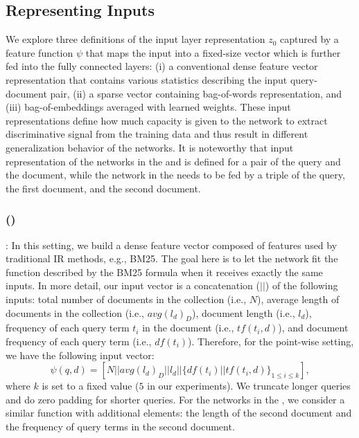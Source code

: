 \subsection{Representing Inputs}
\label{sec:feedings}
We explore three definitions of the input layer representation $z_0$ captured by a feature function $\psi$ that maps the input into a fixed-size vector which is further fed into the fully connected layers: 
(i) a conventional dense feature vector representation that contains various statistics describing the input query-document pair, 
(ii) a sparse vector containing bag-of-words representation, and 
(iii) bag-of-embeddings averaged with learned weights. 
These input representations define how much capacity is given to the network to extract discriminative signal from the training data and thus result in different generalization behavior of the networks. 
It is noteworthy that input representation of the networks in the \modelone and \modeltwo is defined for a pair of the query and the document, while the network in the \modelthree needs to be fed by a triple of the query, the first document, and the second document.

\subsubsection{\Feedone (\fone)}: 
In this setting, we build a dense feature vector composed of features used by traditional IR methods, e.g., BM25. The goal here is to let the network fit the function described by the BM25 formula when it receives exactly the same inputs. 
In more detail, our input vector is a concatenation ($||$) of the following inputs: total number of documents in the collection (i.e., $N$), average length of documents in the collection (i.e., $avg(l_d)_D$), document length (i.e., $l_d$), frequency of each query term $t_i$ in the document (i.e., $tf(t_i, d)$), and document frequency of each query term (i.e., $df(t_i)$). Therefore, for the point-wise setting, we have the following input vector:
\begin{equation}
\psi(q, d) = [N || avg(l_d)_D || l_d || \{df(t_i) || tf(t_i,d)\}_{1 \leq i \leq k}],
\end{equation}
where $k$ is set to a fixed value ($5$ in our experiments). 
We truncate longer queries and do zero padding for shorter queries. 
For the networks in the \modelthree, we consider a similar function with additional elements: the length of the second document and the frequency of query terms in the second document.



